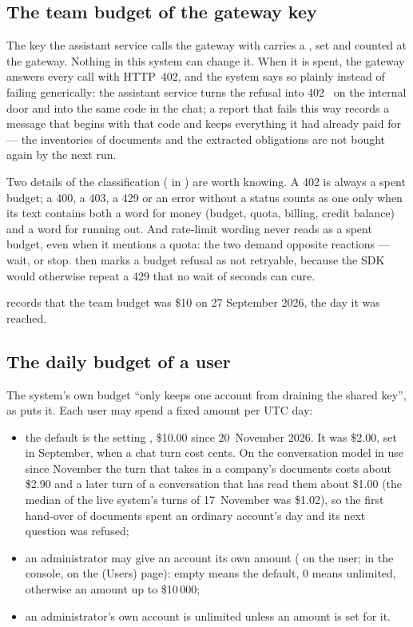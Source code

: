 \subsection{The team budget of the gateway key}

The key the assistant service calls the gateway with carries a , set and
counted at the gateway. Nothing in this system can change it. When it is spent, the gateway
answers every call with HTTP~402, and the system says so plainly instead of failing
generically: the assistant service turns the refusal into 402~ on
the internal door and into the same code in the chat; a report that fails this way records a
message that begins with that code and keeps everything it had already paid for --- the
inventories of documents and the extracted obligations are not bought again by the next run.

Two details of the classification ( in
) are worth knowing. A 402 is always a spent budget; a 400, a 403, a
429 or an error without a status counts as one only when its text contains both a word for money (budget, quota, billing,
credit balance) and a word for running out. And rate-limit wording never reads as a spent
budget, even when it mentions a quota: the two demand opposite reactions --- wait, or stop.
 then marks a budget refusal as not retryable, because the SDK
would otherwise repeat a 429 that no wait of seconds can cure.

 records that the team budget was \$10 on 27 September 2026, the day
it was reached.

\subsection{The daily budget of a user}

The system's own budget \enquote{only keeps one account from draining the shared key}, as
 puts it. Each user may spend a fixed amount per UTC day:

\begin{itemize}
  \item the default is the setting , \$10.00 since 20~November
    2026. It was \$2.00, set in September, when a chat turn cost cents. On the conversation
    model in use since November the turn that takes in a company's documents costs about
    \$2.90 and a later turn of a conversation that has read them about \$1.00 (the median of
    the live system's turns of 17~November was \$1.02), so the first hand-over of documents
    spent an ordinary account's day and its next question was refused;
  \item an administrator may give an account its own amount ( on the
    user; in the console, on the  (Users) page): empty means the default, 0
    means unlimited, otherwise an amount up to \$10\,000;
  \item an administrator's own account is unlimited unless an amount is set for it.
\end{itemize}

